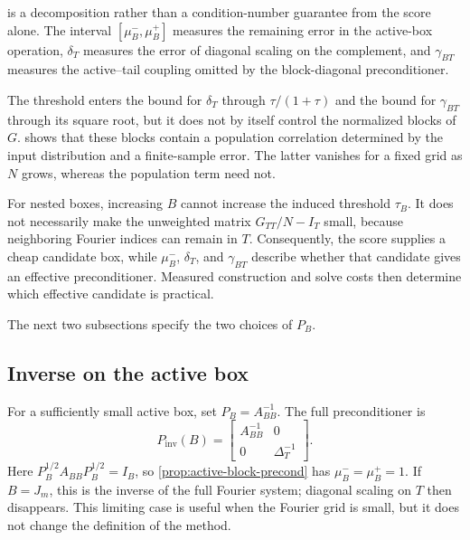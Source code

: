 \begin{remark}
\label{rem:three-term-interpretation}
 is a decomposition rather than a
condition-number guarantee from the score alone. The interval
\([\mu_B^-,\mu_B^+]\) measures the remaining error in the active-box
operation, \(\delta_T\) measures the error of diagonal scaling on the
complement, and \(\gamma_{BT}\) measures the active--tail coupling omitted by
the block-diagonal preconditioner.

The threshold enters the bound for \(\delta_T\) through
\(\tau/(1+\tau)\) and the bound for \(\gamma_{BT}\) through its square root,
but it does not by itself control the normalized blocks of \(G\).
 shows that these blocks contain a
population correlation determined by the input distribution and a
finite-sample error. The latter vanishes for a fixed grid as \(N\) grows,
whereas the population term need not.

For nested boxes, increasing \(B\) cannot increase the induced threshold
\(\tau_B\). It does not necessarily make the unweighted matrix
\(G_{TT}/N-I_T\) small, because neighboring Fourier indices can remain in
\(T\). Consequently, the score supplies a cheap candidate box, while
\(\mu_B^-\), \(\delta_T\), and \(\gamma_{BT}\) describe whether that
candidate gives an effective preconditioner. Measured construction and solve
costs then determine which effective candidate is practical.
\end{remark}

The next two subsections specify the two choices of \(P_B\).

\subsection{Inverse on the active box}
\label{subsec:inverse-based-preconditioner}
For a sufficiently small active box, set \(P_B=A_{BB}^{-1}\). The full
preconditioner is
\[
    P_{\mathrm{inv}}(B)
    =
    \begin{bmatrix}
        A_{BB}^{-1} & 0\\
        0 & \Delta_T^{-1}
    \end{bmatrix}.
\]
Here \(P_B^{1/2}A_{BB}P_B^{1/2}=I_B\), so
\cref{prop:active-block-precond} has \(\mu_B^-=\mu_B^+=1\). If
\(B=J_m\), this is the inverse of the full Fourier system; diagonal scaling on
\(T\) then disappears. This limiting case is useful when the Fourier grid is
small, but it does not change the definition of the method.

